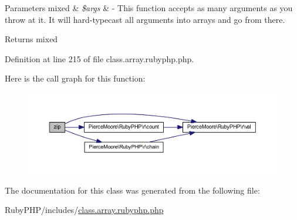 \begin{DoxyParams}[1]{Parameters}
mixed & {\em \$args} & -\/ This function accepts as many arguments as you throw at it. It will hard-\/typecast all arguments into arrays and go from there. \\
\hline
\end{DoxyParams}
\begin{DoxyReturn}{Returns}
mixed 
\end{DoxyReturn}


Definition at line 215 of file class.\-array.\-rubyphp.\-php.



Here is the call graph for this function\-:
\nopagebreak
\begin{figure}[H]
\begin{center}
\leavevmode
\includegraphics[width=350pt]{class_pierce_moore_1_1_ruby_p_h_p_1_1r_array_a2dba4fd3850e2c373dad4604d170dfa6_cgraph}
\end{center}
\end{figure}




The documentation for this class was generated from the following file\-:\begin{DoxyCompactItemize}
\item 
Ruby\-P\-H\-P/includes/\hyperlink{class_8array_8rubyphp_8php}{class.\-array.\-rubyphp.\-php}\end{DoxyCompactItemize}
